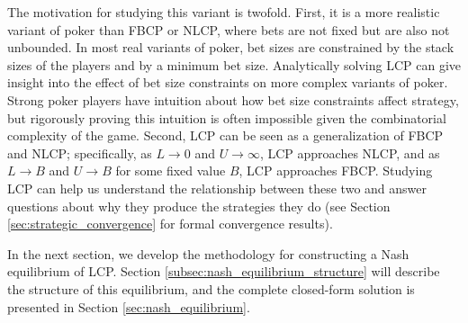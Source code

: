 \documentclass[../../main/main.tex]{subfiles}
\begin{document}
The motivation for studying this variant is twofold. First, it is a more realistic variant of poker than FBCP or NLCP, where bets are not fixed but are also not unbounded. In most real variants of poker, bet sizes are constrained by the stack sizes of the players and by a minimum bet size. Analytically solving LCP can give insight into the effect of bet size constraints on more complex variants of poker. Strong poker players have intuition about how bet size constraints affect strategy, but rigorously proving this intuition is often impossible given the combinatorial complexity of the game. Second, LCP can be seen as a generalization of FBCP and NLCP; specifically, as $L \to 0$ and $U \to \infty$, LCP approaches NLCP, and as $L \to B$ and $U \to B$ for some fixed value $B$, LCP approaches FBCP. Studying LCP can help us understand the relationship between these two and answer questions about why they produce the strategies they do (see Section \ref{sec:strategic_convergence} for formal convergence results).

In the next section, we develop the methodology for constructing a Nash equilibrium of LCP. Section \ref{subsec:nash_equilibrium_structure} will describe the structure of this equilibrium, and the complete closed-form solution is presented in Section \ref{sec:nash_equilibrium}.
\end{document}
